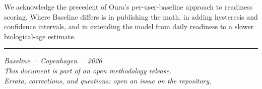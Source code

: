 \documentclass[11pt, a4paper]{article}
\newcommand{\hr}{%
  \vspace{0.8em}\par
  {\color{rule}\rule{\linewidth}{0.4pt}}%
  \par\vspace{0.8em}%
}
\begin{document}
We acknowledge the precedent of Oura's per-user-baseline approach to readiness scoring. Where Baseline differs is in publishing the math, in adding hysteresis and confidence intervals, and in extending the model from daily readiness to a slower biological-age estimate.

\vspace{2em}
\hr
\vspace{0.5em}

\begin{center}
\color{muted}\small\itshape
Baseline · Copenhagen · 2026 \\[0.4em]
This document is part of an open methodology release. \\
Errata, corrections, and questions: open an issue on the repository.
\end{center}
\end{document}
